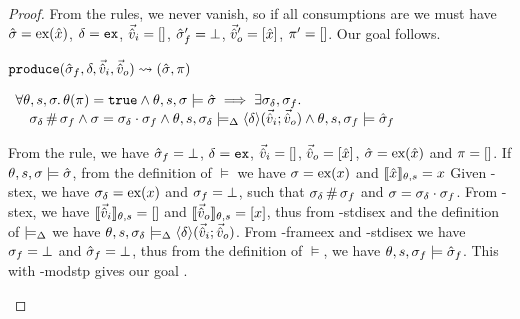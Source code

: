 \begin{proof}
From the \consume{} rules, we never vanish, so if all consumptions are \Ok{} we must have $\hat{\sigma}=\text{ex}(\hat{x})$, $\delta=\texttt{ex}$, $\vec{\hat{v}}_i=[]$, $\hat{\sigma}_f'=\bot$, $\vec{\hat{v}}_o'=[\hat{x}]$, $\pi'=[]$. Our goal  follows.


\pfassume \begin{hypvlist}
 $\texttt{produce}(\hat{\sigma}_f,\delta,\vec{\hat{v}}_i,\vec{\hat{v}}_o)\rightsquigarrow (\hat{\sigma}, \pi)$
\end{hypvlist}
\pfprove \begin{goalvlist}
 $\begin{array}{l}
\forall\theta,s,\sigma\ldotp \theta(\pi)=\texttt{true} \land \theta,s,\sigma\models\hat{\sigma} \implies \exists \sigma_\delta, \sigma_f\ldotp \\
\quad \sigma_\delta\operatorname{\#}\sigma_f \land \sigma=\sigma_\delta\cdot\sigma_f \land \theta,s,\sigma_\delta \models_{\Delta} \left<\delta\right>\!(\vec{\hat{v}}_i;\vec{\hat{v}}_o) \land \theta,s,\sigma_f \models \hat{\sigma}_f
\end{array}$
\end{goalvlist}
\begin{hypvlist}
 From the \produce{} rule, we have $\hat{\sigma}_f=\bot$, $\delta=\texttt{ex}$, $\vec{\hat{v}}_i=[]$, $\vec{\hat{v}}_o=[\hat{x}]$, $\hat{\sigma}=\text{ex}(\hat{x})$ and $\pi=[]$.
 If $\theta,s,\sigma\models\hat{\sigma}$, from the definition of $\models$ we have $\sigma=\text{ex}(x)$ and $\llbracket\hat{x}\rrbracket_{\theta,s}=x$
 Given \hyp{stex}, we have $\sigma_\delta=\text{ex}(x)$ and $\sigma_f=\bot$, such that $\sigma_\delta\operatorname{\#}\sigma_f$ and $\sigma=\sigma_\delta\cdot\sigma_f$.
 From \hyp{stex}, we have $\llbracket\vec{\hat{v}}_i\rrbracket_{\theta,s}=[]$ and $\llbracket\vec{\hat{v}}_o\rrbracket_{\theta,s}=[x]$, thus from \hyp{stdisex} and the definition of $\models_{\Delta}$ we have $\theta,s,\sigma_\delta\models_{\Delta}\left<\delta\right>\!(\vec{\hat{v}}_i;\vec{\hat{v}}_o)$.
 From \hyp{frameex} and \hyp{stdisex} we have $\sigma_f=\bot$ and $\hat{\sigma}_f=\bot$, thus from the definition of $\models$, we have $\theta,s,\sigma_f\models\hat{\sigma}_f$. This with \hyp{modstp} gives our goal .
\end{hypvlist}



\end{proof}
